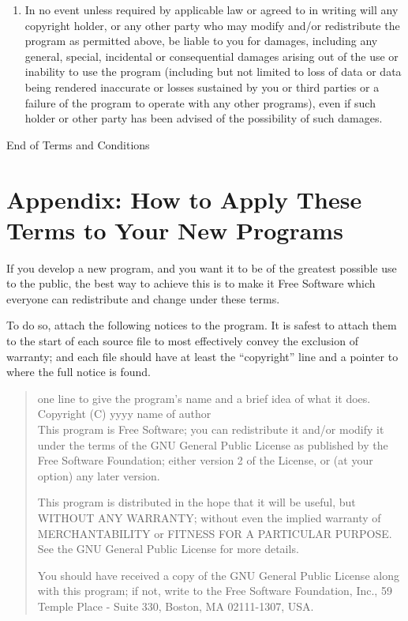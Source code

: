 \documentclass[11pt, letterpaper]{book}
\begin{document}
\begin{enumerate}
\item {\sc In no event unless required by applicable law or agreed to
    in writing will any copyright holder, or any other party who may
    modify and/or redistribute the program as permitted above, be
    liable to you for damages, including any general, special,
    incidental or consequential damages arising out of the use or
    inability to use the program (including but not limited to loss of
    data or data being rendered inaccurate or losses sustained by you
    or third parties or a failure of the program to operate with any
    other programs), even if such holder or other party has been
    advised of the possibility of such damages.}

\end{enumerate}


\begin{center}
{\Large\sc End of Terms and Conditions}
\end{center}
\vfill

\pagebreak[4]

\section*{Appendix: How to Apply These Terms to Your New Programs}

If you develop a new program, and you want it to be of the greatest
possible use to the public, the best way to achieve this is to make it
Free Software which everyone can redistribute and change under these
terms.

  To do so, attach the following notices to the program. It is safest to
  attach them to the start of each source file to most effectively convey
  the exclusion of warranty; and each file should have at least the
  ``copyright'' line and a pointer to where the full notice is found.

\begin{quote}
one line to give the program's name and a brief idea of what it does. \\
Copyright (C) yyyy  name of author \\

This program is Free Software; you can redistribute it and/or modify
it under the terms of the GNU General Public License as published by
the Free Software Foundation; either version 2 of the License, or
(at your option) any later version.

This program is distributed in the hope that it will be useful,
but WITHOUT ANY WARRANTY; without even the implied warranty of
MERCHANTABILITY or FITNESS FOR A PARTICULAR PURPOSE. See the
GNU General Public License for more details.

You should have received a copy of the GNU General Public License
along with this program; if not, write to the Free Software
Foundation, Inc., 59 Temple Place - Suite 330, Boston, MA  02111-1307, USA.
\end{quote}
\end{document}

